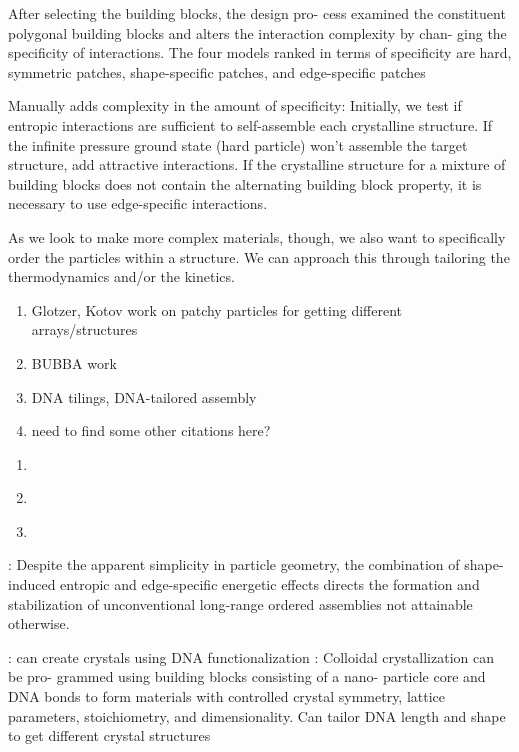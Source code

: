 After selecting the building blocks, the design pro- cess examined the constituent polygonal building blocks and alters the interaction complexity by chan- ging the specificity of interactions. The four models ranked in terms of specificity are hard, symmetric patches, shape-specific patches, and edge-specific patches

Manually adds complexity in the amount of specificity:
Initially, we test if entropic interactions are sufficient to self-assemble each crystalline structure. If the infinite pressure ground state (hard particle) won't assemble the target structure, add attractive interactions. If the crystalline structure for a mixture of building blocks does not contain the alternating building block property, it is necessary to use edge-specific interactions.


As we look to make more complex materials, though, we also want to specifically order the particles within a structure.
We can approach this through tailoring the thermodynamics and/or the kinetics.

\begin{enumerate}
\item Glotzer, Kotov work on patchy particles for getting different arrays/structures
\item BUBBA work
\item DNA tilings, DNA-tailored assembly
\item need to find some other citations here?
\end{enumerate}

\begin{enumerate}
\item \cite{Damasceno_2012_Science,Ye_2013_NatChem,Zhang_2004_NanoLetters}
\item \cite{Jankowski_2009_JChemPhys,Jankowski_2011_JPhysChemB,Jankowski_2012_SoftMatter}
\item \cite{Mirkin_1996_Nature,Park_2008_Nature,OBrien_2016_JACS}
\end{enumerate}

\cite{Ye_2013_NatChem}: Despite the apparent simplicity in particle geometry, the combination of shape-induced entropic and edge-specific energetic effects directs the formation and stabilization of unconventional long-range ordered assemblies not attainable otherwise.

\cite{Park_2008_Nature}: can create crystals using DNA functionalization
\cite{OBrien_2016_JACS}: Colloidal crystallization can be pro- grammed using building blocks consisting of a nano- particle core and DNA bonds to form materials with controlled crystal symmetry, lattice parameters, stoichiometry, and dimensionality. Can tailor DNA length and shape to get different crystal structures

